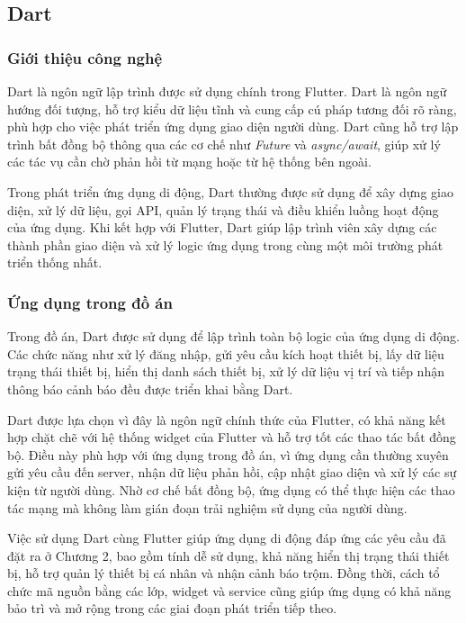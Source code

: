 \documentclass[../DoAn.tex]{subfiles}
\begin{document}
\subsection{Dart}
\label{subsection:3.dart}

\subsubsection{Giới thiệu công nghệ}

Dart là ngôn ngữ lập trình được sử dụng chính trong Flutter. Dart là ngôn ngữ hướng đối tượng, hỗ trợ kiểu dữ liệu tĩnh và cung cấp cú pháp tương đối rõ ràng, phù hợp cho việc phát triển ứng dụng giao diện người dùng. Dart cũng hỗ trợ lập trình bất đồng bộ thông qua các cơ chế như \textit{Future} và \textit{async/await}, giúp xử lý các tác vụ cần chờ phản hồi từ mạng hoặc từ hệ thống bên ngoài.

Trong phát triển ứng dụng di động, Dart thường được sử dụng để xây dựng giao diện, xử lý dữ liệu, gọi API, quản lý trạng thái và điều khiển luồng hoạt động của ứng dụng. Khi kết hợp với Flutter, Dart giúp lập trình viên xây dựng các thành phần giao diện và xử lý logic ứng dụng trong cùng một môi trường phát triển thống nhất.

\subsubsection{Ứng dụng trong đồ án}

Trong đồ án, Dart được sử dụng để lập trình toàn bộ logic của ứng dụng di động. Các chức năng như xử lý đăng nhập, gửi yêu cầu kích hoạt thiết bị, lấy dữ liệu trạng thái thiết bị, hiển thị danh sách thiết bị, xử lý dữ liệu vị trí và tiếp nhận thông báo cảnh báo đều được triển khai bằng Dart.

Dart được lựa chọn vì đây là ngôn ngữ chính thức của Flutter, có khả năng kết hợp chặt chẽ với hệ thống widget của Flutter và hỗ trợ tốt các thao tác bất đồng bộ. Điều này phù hợp với ứng dụng trong đồ án, vì ứng dụng cần thường xuyên gửi yêu cầu đến server, nhận dữ liệu phản hồi, cập nhật giao diện và xử lý các sự kiện từ người dùng. Nhờ cơ chế bất đồng bộ, ứng dụng có thể thực hiện các thao tác mạng mà không làm gián đoạn trải nghiệm sử dụng của người dùng.

Việc sử dụng Dart cùng Flutter giúp ứng dụng di động đáp ứng các yêu cầu đã đặt ra ở Chương 2, bao gồm tính dễ sử dụng, khả năng hiển thị trạng thái thiết bị, hỗ trợ quản lý thiết bị cá nhân và nhận cảnh báo trộm. Đồng thời, cách tổ chức mã nguồn bằng các lớp, widget và service cũng giúp ứng dụng có khả năng bảo trì và mở rộng trong các giai đoạn phát triển tiếp theo.
\end{document}
